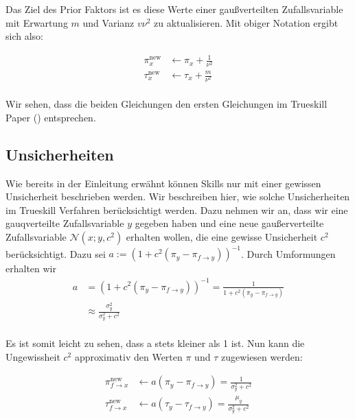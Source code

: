 \documentclass[12pt,a4paper]{scrartcl}
\numberwithin{equation}{section}
\begin{document}
 Das Ziel des Prior Faktors ist es diese Werte einer gaußverteilten Zufallsvariable mit Erwartung $m$ und Varianz $v\nu^2$ zu aktualisieren. 
 Mit obiger Notation ergibt sich also:
 
 \begin{equation}
  \begin{split}
    \pi_x^{\text{new}} &\leftarrow \pi_x + \frac{1}{\nu^2} \\
    \tau_x^{\text{new}} &\leftarrow \tau_x + \frac{m}{\nu^2} \\
  \end{split}
 \end{equation}

  Wir sehen, dass die beiden Gleichungen den ersten Gleichungen im Trueskill Paper () entsprechen. 
  
  \subsection{Unsicherheiten}
  
  Wie bereits in der Einleitung erwähnt können Skills nur mit einer gewissen Unsicherheit beschrieben werden. Wir beschreiben hier, wie solche Unsicherheiten im Trueskill Verfahren
  berücksichtigt werden. 
  Dazu nehmen wir an, dass wir eine gauqverteilte Zufallsvariable $y$ gegeben haben und eine neue gaußerverteilte Zufallsvariable $\mathcal{N}(x;y,c^2)$ erhalten wollen, die eine gewisse Unsicherheit
  $c^2$ berücksichtigt.  
  Dazu sei $a := (1+c^2(\pi_y - \pi_{f \rightarrow y}))^{-1}$.
  Durch Umformungen erhalten wir
  \begin{equation}
  \begin{split}
   a &= (1+c^2(\pi_y - \pi_{f \rightarrow y}))^{-1} = \frac{1}{1+c^2(\pi_y - \pi_{f \rightarrow y})} \\
   &\approx \frac{\sigma_y^2}{\sigma_y^2 + c^2} \\
  \end{split}
  \end{equation}
  
  Es ist somit leicht zu sehen, dass a stets kleiner als 1 ist. Nun kann die Ungewissheit $c^2$ approximativ den Werten $\pi$ und $\tau$ zugewiesen werden: 
  
  \begin{equation}
   \begin{split}
      \pi_{f \rightarrow x}^{\text{new}} &\leftarrow a(\pi_y - \pi_{f \rightarrow y}) = \frac{1}{\sigma_y^2 + c^2} \\
      \tau_{f \rightarrow x}^{\text{new}} &\leftarrow a(\tau_y - \tau_{f \rightarrow y}) = \frac{\mu_y}{\sigma_y^2 + c^2} \\
   \end{split}
  \end{equation}
\end{document}
